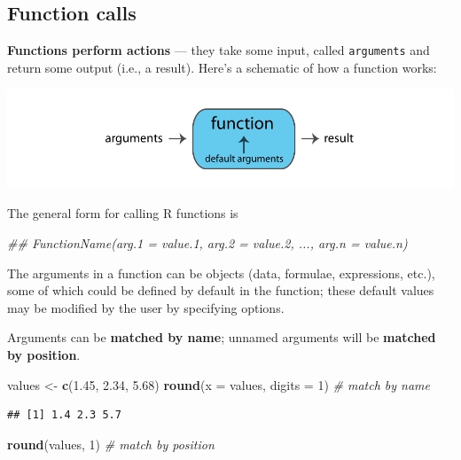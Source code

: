 \documentclass[
]{book}
\newenvironment{Shaded}{\begin{snugshade}}{\end{snugshade}}
\newcommand{\CommentTok}[1]{\textcolor[rgb]{0.56,0.35,0.01}{\textit{#1}}}
\newcommand{\DataTypeTok}[1]{\textcolor[rgb]{0.13,0.29,0.53}{#1}}
\newcommand{\DecValTok}[1]{\textcolor[rgb]{0.00,0.00,0.81}{#1}}
\newcommand{\FloatTok}[1]{\textcolor[rgb]{0.00,0.00,0.81}{#1}}
\newcommand{\KeywordTok}[1]{\textcolor[rgb]{0.13,0.29,0.53}{\textbf{#1}}}
\newcommand{\NormalTok}[1]{#1}
\newcommand{\StringTok}[1]{\textcolor[rgb]{0.31,0.60,0.02}{#1}}
\begin{document}
\hypertarget{function-calls}{%
\subsection{Function calls}\label{function-calls}}

\textbf{Functions perform actions} --- they take some input, called \texttt{arguments} and return some
output (i.e., a result). Here's a schematic of how a function works:

\includegraphics{R/Rintro/images/function.png}

The general form for calling R functions is

\begin{Shaded}
\begin{Highlighting}[]
\CommentTok{## FunctionName(arg.1 = value.1, arg.2 = value.2, ..., arg.n = value.n)}
\end{Highlighting}
\end{Shaded}

The arguments in a function can be objects (data, formulae, expressions, etc.),
some of which could be defined by default in the function; these default values may
be modified by the user by specifying options.

Arguments can be \textbf{matched by name}; unnamed arguments will be \textbf{matched by position}.

\begin{Shaded}
\begin{Highlighting}[]
\NormalTok{values <-}\StringTok{ }\KeywordTok{c}\NormalTok{(}\FloatTok{1.45}\NormalTok{, }\FloatTok{2.34}\NormalTok{, }\FloatTok{5.68}\NormalTok{)}
\KeywordTok{round}\NormalTok{(}\DataTypeTok{x =}\NormalTok{ values, }\DataTypeTok{digits =} \DecValTok{1}\NormalTok{) }\CommentTok{# match by name}
\end{Highlighting}
\end{Shaded}

\begin{verbatim}
## [1] 1.4 2.3 5.7
\end{verbatim}

\begin{Shaded}
\begin{Highlighting}[]
\KeywordTok{round}\NormalTok{(values, }\DecValTok{1}\NormalTok{) }\CommentTok{# match by position}
\end{Highlighting}
\end{Shaded}
\end{document}
